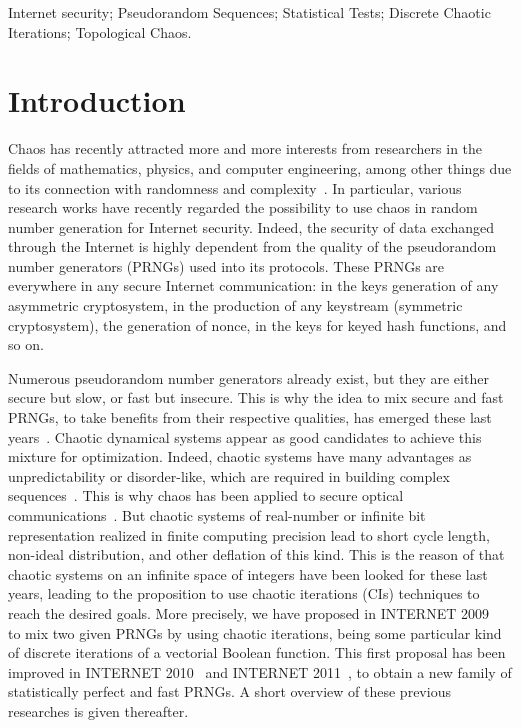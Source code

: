 \documentclass[10pt, conference, compsocconf]{IEEEtran}
\begin{document}
\begin{IEEEkeywords}
Internet security; Pseudorandom Sequences; Statistical Tests; Discrete Chaotic Iterations; Topological Chaos.
\end{IEEEkeywords}

\IEEEpeerreviewmaketitle



\section{Introduction}

Chaos has recently attracted more and more interests from researchers in the fields of mathematics, physics, 
and computer engineering, among other things due to its connection with randomness and complexity~\cite{Behnia20113455,Guyeux10}.
In particular, various research works have recently regarded the possibility to use chaos in random number generation for Internet security.
Indeed, the security of data exchanged through the Internet is highly dependent from the quality
of the pseudorandom number generators (PRNGs) used into its protocols. These PRNGs are everywhere
in any secure Internet communication: in the keys generation of any asymmetric cryptosystem, in
the production of any keystream (symmetric cryptosystem), the generation of nonce, in the
keys for keyed hash functions, and so on.

Numerous pseudorandom number generators already exist, but they are either secure but slow, or
fast but insecure.
This is why the idea to mix secure and fast PRNGs, to take benefits from their respective qualities, has emerged 
these last years~\cite{Guyeux10,guyeux10ter}.
Chaotic dynamical systems appear as good candidates to achieve this mixture for optimization.
Indeed, chaotic systems have many advantages as unpredictability or disorder-like, which are required in building complex sequences~\cite{Hu20092286,DeMicco20083373}. This is why chaos has been applied to secure optical communications~\cite{Larger10}.
But chaotic systems of real-number or infinite bit representation realized in finite computing precision lead to short cycle length, non-ideal distribution, and other deflation of this kind.
This is the reason of that chaotic systems on an infinite space of integers have been looked for these last years, leading to the proposition to use chaotic iterations (CIs) techniques to reach the desired goals.
More precisely, we have proposed in INTERNET 2009~\cite{bgw09:ip} to mix two given PRNGs by using chaotic iterations, being some particular kind of discrete iterations of a vectorial Boolean function.
This first proposal has been improved in INTERNET 2010~\cite{wbg10:ip} and INTERNET 2011~\cite{bcgw11:ip}, to obtain a new family of statistically perfect and fast PRNGs.
A short overview of these previous researches is given thereafter.
\end{document}
